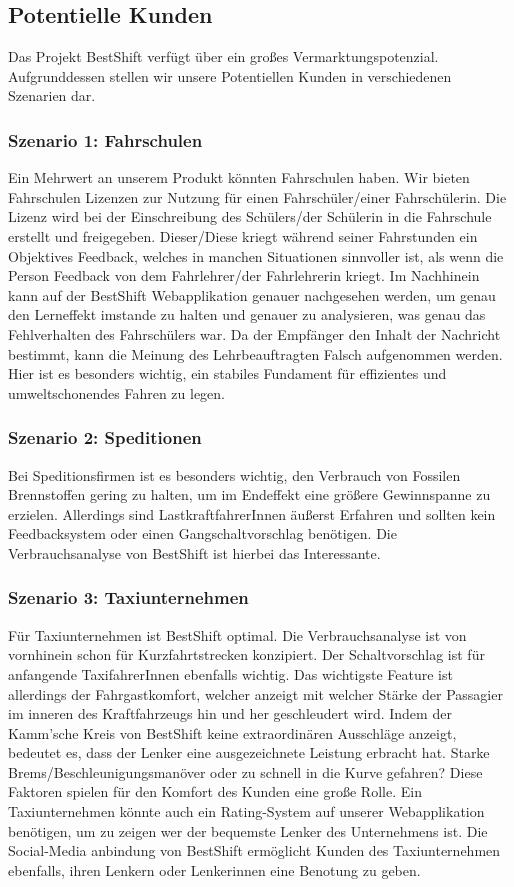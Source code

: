 \subsection{Potentielle Kunden}
Das Projekt BestShift verfügt über ein großes Vermarktungspotenzial.
Aufgrunddessen stellen wir unsere Potentiellen Kunden in verschiedenen Szenarien dar.

\subsubsection{Szenario 1: Fahrschulen}
Ein Mehrwert an unserem Produkt könnten Fahrschulen haben. Wir bieten Fahrschulen
Lizenzen zur Nutzung für einen Fahrschüler/einer Fahrschülerin. Die Lizenz wird bei der Einschreibung des
Schülers/der Schülerin in die Fahrschule erstellt und freigegeben. Dieser/Diese kriegt während seiner
Fahrstunden ein Objektives Feedback, welches in manchen Situationen sinnvoller ist,
als wenn die Person Feedback von dem Fahrlehrer/der Fahrlehrerin kriegt.
Im Nachhinein kann auf der BestShift Webapplikation genauer nachgesehen werden,
um genau den Lerneffekt imstande zu halten und genauer zu analysieren, was genau
das Fehlverhalten des Fahrschülers war.
Da der Empfänger den Inhalt der Nachricht bestimmt, kann die Meinung des Lehrbeauftragten
Falsch aufgenommen werden. Hier ist es besonders wichtig, ein stabiles Fundament für 
effizientes und umweltschonendes Fahren zu legen. 


\subsubsection{Szenario 2: Speditionen}
Bei Speditionsfirmen ist es besonders wichtig, den Verbrauch von Fossilen Brennstoffen gering zu halten, um
im Endeffekt eine größere Gewinnspanne zu erzielen. Allerdings sind LastkraftfahrerInnen äußerst Erfahren und
sollten kein Feedbacksystem oder einen Gangschaltvorschlag benötigen. Die Verbrauchsanalyse von BestShift ist hierbei
das Interessante.


\subsubsection{Szenario 3: Taxiunternehmen}
Für Taxiunternehmen ist BestShift optimal. Die Verbrauchsanalyse ist von vornhinein schon für Kurzfahrtstrecken
konzipiert. Der Schaltvorschlag ist für anfangende TaxifahrerInnen ebenfalls wichtig.
Das wichtigste Feature ist allerdings der Fahrgastkomfort, welcher anzeigt mit welcher Stärke der Passagier
im inneren des Kraftfahrzeugs hin und her geschleudert wird. Indem der Kamm'sche Kreis von BestShift keine 
extraordinären Ausschläge anzeigt, bedeutet es, dass der Lenker eine ausgezeichnete Leistung erbracht hat.
Starke Brems/Beschleunigungsmanöver oder zu schnell in die Kurve gefahren? Diese Faktoren spielen
für den Komfort des Kunden eine große Rolle. Ein Taxiunternehmen könnte auch ein Rating-System auf unserer
Webapplikation benötigen, um zu zeigen wer der bequemste Lenker des Unternehmens ist.
Die Social-Media anbindung von BestShift ermöglicht Kunden des Taxiunternehmen ebenfalls, ihren Lenkern oder
Lenkerinnen eine Benotung zu geben. 

\clearpage %